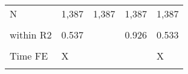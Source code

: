 \begin{table}[!htbp]
\begin{tabular}{lllll}
N & 1,387 & 1,387 & 1,387 & 1,387\\
\cellcolor{gray!10}{R2} & \cellcolor{gray!10}{0.952} & \cellcolor{gray!10}{0.925} & \cellcolor{gray!10}{0.927} & \cellcolor{gray!10}{0.949}\\
\addlinespace
within R2 & 0.537 &  & 0.926 & 0.533\\
\cellcolor{gray!10}{Region FE} & \cellcolor{gray!10}{X} & \cellcolor{gray!10}{} & \cellcolor{gray!10}{X} & \cellcolor{gray!10}{}\\
Time FE & X &  &  & X\\
\cellcolor{gray!10}{SE} & \cellcolor{gray!10}{by: REGION} & \cellcolor{gray!10}{by: REGION} & \cellcolor{gray!10}{by: REGION} & \cellcolor{gray!10}{by: REGION}\\
\bottomrule
\end{tabular}\end{table}

